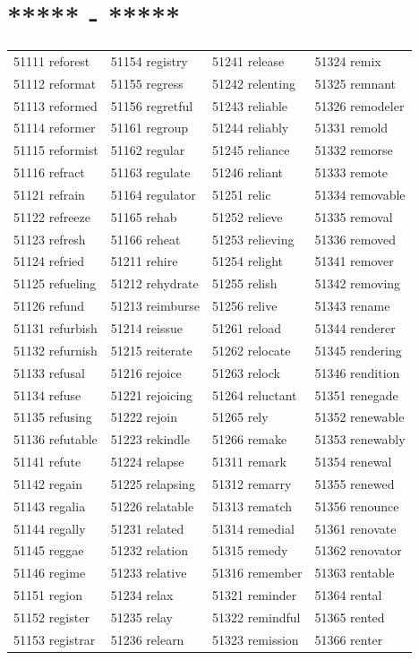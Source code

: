 \documentclass[10pt, oneside]{book}
\begin{document}
\begin{table}[h]
	\centering
	\section*{***** - *****}
	\begin{tabular}{l l l l}
51111 reforest &51154 registry &51241 release &51324 remix\\
51112 reformat &51155 regress &51242 relenting &51325 remnant\\
51113 reformed &51156 regretful &51243 reliable &51326 remodeler\\
51114 reformer &51161 regroup &51244 reliably &51331 remold\\
51115 reformist &51162 regular &51245 reliance &51332 remorse\\
51116 refract &51163 regulate &51246 reliant &51333 remote\\
51121 refrain &51164 regulator &51251 relic &51334 removable\\
51122 refreeze &51165 rehab &51252 relieve &51335 removal\\
51123 refresh &51166 reheat &51253 relieving &51336 removed\\
51124 refried &51211 rehire &51254 relight &51341 remover\\
51125 refueling &51212 rehydrate &51255 relish &51342 removing\\
51126 refund &51213 reimburse &51256 relive &51343 rename\\
51131 refurbish &51214 reissue &51261 reload &51344 renderer\\
51132 refurnish &51215 reiterate &51262 relocate &51345 rendering\\
51133 refusal &51216 rejoice &51263 relock &51346 rendition\\
51134 refuse &51221 rejoicing &51264 reluctant &51351 renegade\\
51135 refusing &51222 rejoin &51265 rely &51352 renewable\\
51136 refutable &51223 rekindle &51266 remake &51353 renewably\\
51141 refute &51224 relapse &51311 remark &51354 renewal\\
51142 regain &51225 relapsing &51312 remarry &51355 renewed\\
51143 regalia &51226 relatable &51313 rematch &51356 renounce\\
51144 regally &51231 related &51314 remedial &51361 renovate\\
51145 reggae &51232 relation &51315 remedy &51362 renovator\\
51146 regime &51233 relative &51316 remember &51363 rentable\\
51151 region &51234 relax &51321 reminder &51364 rental\\
51152 register &51235 relay &51322 remindful &51365 rented\\
51153 registrar &51236 relearn &51323 remission &51366 renter\\
	\end{tabular}
 \end{table}
\end{document}
